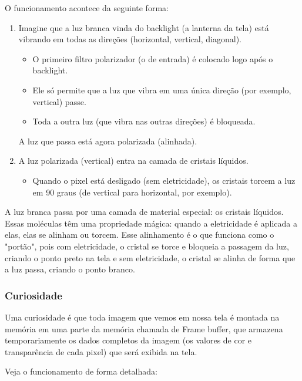\documentclass[12pt,a4paper]{report}
\begin{document}
	O funcionamento acontece da seguinte forma: 
	
	\begin{enumerate}
		\item Imagine que a luz branca vinda do backlight (a lanterna da tela) está vibrando em todas as direções (horizontal, vertical, diagonal).
		\begin{itemize}
			\item O primeiro filtro polarizador (o de entrada) é colocado logo após o backlight.
			\item Ele só permite que a luz que vibra em uma única direção (por exemplo, vertical) passe.
			\item Toda a outra luz (que vibra nas outras direções) é bloqueada.
		\end{itemize}
		A luz que passa está agora polarizada (alinhada).
		
		\item A luz polarizada (vertical) entra na camada de cristais líquidos.
		\begin{itemize}
			\item Quando o pixel está desligado (sem eletricidade), os cristais torcem a luz em 90 graus (de vertical para horizontal, por exemplo).
		\end{itemize}
		
		
		
	\end{enumerate}
	
	A luz branca passa por uma camada de material especial: os cristais líquidos. Essas moléculas têm uma propriedade mágica: quando a eletricidade é aplicada a elas, elas se alinham ou torcem. Esse alinhamento é o que funciona como o "portão", pois com eletricidade, o cristal se torce e bloqueia a passagem da luz, criando o ponto preto na tela e sem eletricidade, o cristal se alinha de forma que a luz passa, criando o ponto branco.
	
	
	\subsubsection{Curiosidade}
	
	Uma curiosidade é que toda imagem que vemos em nossa tela é montada na memória em uma parte da memória chamada de Frame buffer, que armazena temporariamente os dados completos da imagem (os valores de cor e transparência de cada pixel) que será exibida na tela.
	
	Veja o funcionamento de forma detalhada:
	
\end{document}
